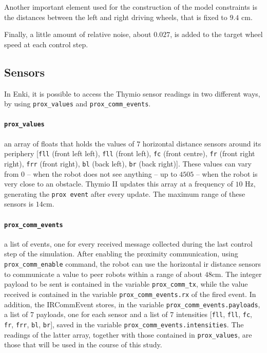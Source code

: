 Another important element used for the construction of the model constraints is 
the distances between the left and right driving wheels, that is fixed to $9.4$ 
\gls{cm}.

Finally, a little amount of relative noise, about $0.027$, is added to the target 
wheel speed at each control step.

\subsection{Sensors}
\label{subsec:enkisensors}
In Enki, it is possible to access the Thymio sensor readings in two different ways, 
by using \texttt{prox\_values} and \texttt{prox\_comm\_events}.

\paragraph{\texttt{prox\_values}}
 an array of floats that holds the values of $7$ horizontal distance sensors around 
 its periphery [\texttt{fll} (front left left), \texttt{fll} (front left), \texttt{fc} (front 
 centre), \texttt{fr} (front right right), \texttt{frr} (front right), \texttt{bl} (back left), 
 \texttt{br} (back right)]. 
These values can vary from $0$ – when the robot does not see anything – up to 
$4505$ – when the robot is very close to an obstacle. 
Thymio II updates this array at a frequency of $10$ \gls{Hz}, generating the 
\texttt{prox event} after every update. 
The maximum range of these sensors is $14$\gls{cm}.

\paragraph{\texttt{prox\_comm\_events}}

a list of events, one for every received message collected during the last control 
step of the simulation. 
After enabling the proximity communication, using \texttt{prox\_comm\_enable} 
command, the robot can use the horizontal \gls{ir} distance sensors to 
communicate a value to peer robots within a range of about $48$\gls{cm}. 
The integer payload to be sent is contained in the variable 
\texttt{prox\_comm\_tx}, while the value received is contained in the variable 
\texttt{prox\_comm\_events.rx} of the fired event.
In addition, the IRCommEvent stores, in the variable 
\texttt{prox\_comm\_events.payloads}, a list of $7$ payloads, one for each sensor 
and a list of  $7$ intensities  [\texttt{fll}, \texttt{fll}, \texttt{fc}, \texttt{fr}, 
\texttt{frr}, \texttt{bl}, \texttt{br}], saved in the variable 
\texttt{prox\_comm\_events.intensities}.
The readings of the latter array, together with those contained in 
\texttt{prox\_values}, are those that will be used in the course of this study.

